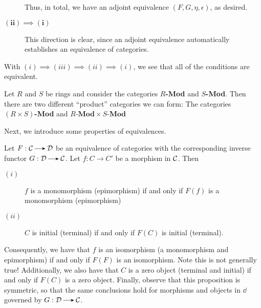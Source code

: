 \begin{prf}
\begin{description}
            Thus, in total, we have an adjoint equivalence $(F, G, \eta,
            \epsilon)$, as desired. 
            
            \item[$\bm{(ii) \implies (i)}$] This direction is clear,
            since an adjoint equivalence automatically establishes an
            equivalence of categories. 
        \end{description}
        With $(i) \implies (iii) \implies (ii) \implies (i)$, we see
        that all of the conditions are equivalent. 
    \end{prf}

    \begin{example}
        Let $R$ and $S$ be rings and consider the categories 
        $R$\textbf{-Mod} and $S$\textbf{-Mod}. Then there are two different 
        ``product'' categories we can form: The categories $(R \times S)$\textbf{-Mod} 
        and $R\textbf{-Mod}\times S\textbf{-Mod}$
    \end{example}

    Next, we introduce some properties of equivalences. 
    \begin{proposition}
        Let $F: \cc \to \dd$ be an equivalence of categories with the
        corresponding inverse functor $G: \dd \to \cc$. Let $f: C \to
        C'$ be a morphism in $\mathcal{C}$. Then  
        \begin{description}
            \item[$(i)$] $f$ is a monomorphism (epimorphism)
            if and only if 
            $F(f)$ is a monomorphism (epimorphism)
            \item[$(ii)$] $C$ is initial (terminal) if and only if $F(C)$ is initial (terminal).
        \end{description}
    \end{proposition}

    Consequently, we have that $f$ is an isomorphism (a monomorphism and epimorphism) if and only
    if $F(F)$ is an isomorphism. 
    \textcolor{Red!90}{Note this is not generally true!}
    Additionally, we also have that
    $C$ is a zero object (terminal and initial) if and only if
    $F(C)$ is a zero object. Finally, observe that this
    proposition is symmetric, so that the same conclusions hold
    for morphisms and objects in $\dd$ governed by $G: \dd \to
    \cc$. 

